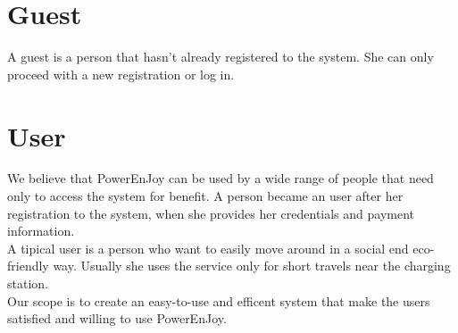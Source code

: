 \section{Guest}
A guest is a person that hasn't already registered to the system. She can only proceed with a new registration or log in.
\section{User}
We believe that PowerEnJoy can be used by a wide range of people that need only to access the system for benefit. A person became an user after her registration to the system, when she provides her credentials and payment information. 
\\A tipical user is a person who want to easily move around in a social end eco-friendly way. Usually she uses the service only for short travels near the \Gls{charging station}.
\\Our scope is to create an easy-to-use and efficent system that make the users satisfied and willing to use PowerEnJoy.

